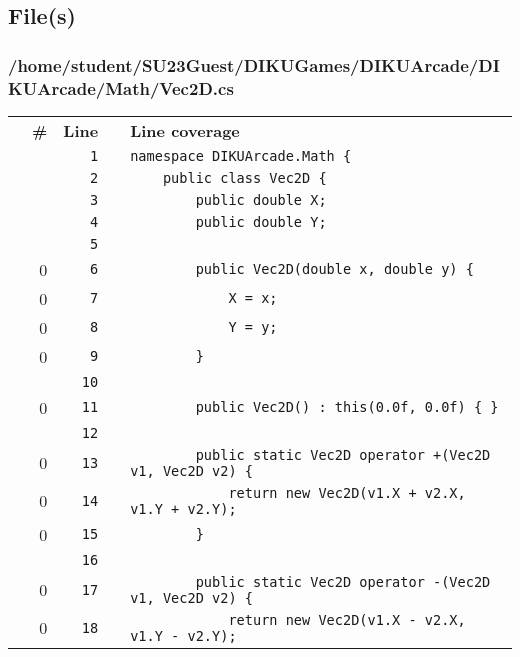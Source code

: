 \documentclass[a4paper,landscape,10pt]{article}
\begin{document}
\subsection{File(s)}
\subsubsection{/home/student/SU23Guest/DIKUGames/DIKUArcade/DIKUArcade/Math/Vec2D.cs}
\begin{longtable}[l]{lrrll}
\textbf{} & \textbf{\#} & \textbf{Line} & \textbf{} & \textbf{Line coverage}\\
\cellcolor{gray} &  & \verb~1~ & & \verb~namespace DIKUArcade.Math {~\\
\cellcolor{gray} &  & \verb~2~ & & \verb~    public class Vec2D {~\\
\cellcolor{gray} &  & \verb~3~ & & \verb~        public double X;~\\
\cellcolor{gray} &  & \verb~4~ & & \verb~        public double Y;~\\
\cellcolor{gray} &  & \verb~5~ & & \verb~~\\
\cellcolor{red} & 0 & \verb~6~ & & \verb~        public Vec2D(double x, double y) {~\\
\cellcolor{red} & 0 & \verb~7~ & & \verb~            X = x;~\\
\cellcolor{red} & 0 & \verb~8~ & & \verb~            Y = y;~\\
\cellcolor{red} & 0 & \verb~9~ & & \verb~        }~\\
\cellcolor{gray} &  & \verb~10~ & & \verb~~\\
\cellcolor{red} & 0 & \verb~11~ & & \verb~        public Vec2D() : this(0.0f, 0.0f) { }~\\
\cellcolor{gray} &  & \verb~12~ & & \verb~~\\
\cellcolor{red} & 0 & \verb~13~ & & \verb~        public static Vec2D operator +(Vec2D v1, Vec2D v2) {~\\
\cellcolor{red} & 0 & \verb~14~ & & \verb~            return new Vec2D(v1.X + v2.X, v1.Y + v2.Y);~\\
\cellcolor{red} & 0 & \verb~15~ & & \verb~        }~\\
\cellcolor{gray} &  & \verb~16~ & & \verb~~\\
\cellcolor{red} & 0 & \verb~17~ & & \verb~        public static Vec2D operator -(Vec2D v1, Vec2D v2) {~\\
\cellcolor{red} & 0 & \verb~18~ & & \verb~            return new Vec2D(v1.X - v2.X, v1.Y - v2.Y);~\\

\end{longtable}
\end{document}
